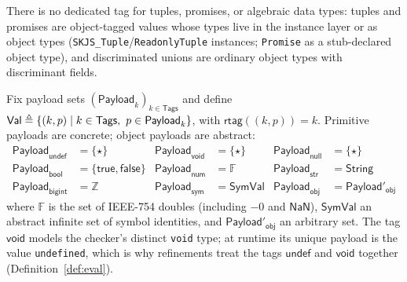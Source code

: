 \documentclass[11pt]{article}
\newcommand{\String}{\mathsf{String}}
\newcommand{\SymVal}{\mathsf{SymVal}}
\newcommand{\Tags}{\mathsf{Tags}}
\newcommand{\rtag}{\mathsf{rtag}}
\newcommand{\Payload}{\mathsf{Payload}}
\begin{document}
There is no dedicated tag for tuples, promises, or algebraic data types:
tuples and promises are object-tagged values whose types live in the
instance layer or as object types
(\texttt{SKJS\_Tuple}/\texttt{ReadonlyTuple} instances; \texttt{Promise} as a
stub-declared object type), and discriminated unions are ordinary object
types with discriminant fields.

\begin{definition}
\label{def:runtime-values}
Fix payload sets $(\Payload_k)_{k\in\Tags}$ and define
$\Val \triangleq \{(k,p) \mid k \in \Tags,\ p \in \Payload_k\}$, with
$\rtag((k,p)) = k$. Primitive payloads are concrete; object payloads are
abstract:
\begin{align*}
\Payload_{\mathsf{undef}} &= \{\star\} &
\Payload_{\mathsf{void}} &= \{\star\} &
\Payload_{\mathsf{null}} &= \{\star\} \\
\Payload_{\mathsf{bool}} &= \{\mathsf{true},\mathsf{false}\} &
\Payload_{\mathsf{num}} &= \mathbb{F} &
\Payload_{\mathsf{str}} &= \String \\
\Payload_{\mathsf{bigint}} &= \mathbb{Z} &
\Payload_{\mathsf{sym}} &= \SymVal &
\Payload_{\mathsf{obj}} &= \Payload'_{\mathsf{obj}}
\end{align*}
where $\mathbb{F}$ is the set of IEEE-754 doubles (including $-0$ and
$\mathsf{NaN}$), $\SymVal$ an abstract infinite set of symbol identities, and
$\Payload'_{\mathsf{obj}}$ an arbitrary set. The tag $\mathsf{void}$ models
the checker's distinct \texttt{void} type; at runtime its unique payload is
the value \texttt{undefined}, which is why refinements treat the tags
$\mathsf{undef}$ and $\mathsf{void}$ together (Definition~\ref{def:eval}).
\end{definition}
\end{document}
